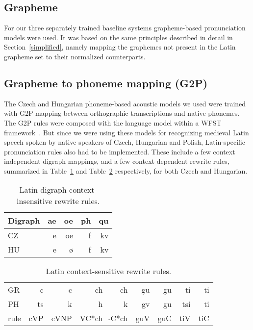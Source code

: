 \documentclass[runningheads,a4paper]{llncs}
\begin{document}
\subsection{Grapheme}
For our three separately trained baseline systems grapheme-based pronunciation models were used.
It was based on the same principles described in detail in Section~\ref{simplified}, namely mapping the graphemes not present in the Latin grapheme set to their normalized counterparts.
\subsection{Grapheme to phoneme mapping (G2P)}\label{g2p}
The Czech and Hungarian phoneme-based acoustic models we used were trained with G2P mapping between orthographic transcriptions and native phonemes.
The G2P rules were composed with the language model within a WFST framework~\cite{wfst}.
But since we were using these models for recognizing medieval Latin speech spoken by native speakers of Czech, Hungarian and Polish, Latin-specific pronunciation rules also had to be implemented. 
These include a few context independent digraph mappings, and a few context dependent rewrite rules, summarized in Table~\ref{tbl:digraph} and Table~\ref{tbl:context} respectively, for both Czech and Hungarian.

\begin{table}\label{tbl:digraph}
	\centering
	\caption{Latin digraph context-insensitive rewrite rules.}
	\begin{tabular}{l|rrrr}
	\hline
	Digraph & ae & oe & ph & qu \\
	\hline
	CZ & e & oe & f & kv \\
	HU & e & \o & f & kv \\
	\hline
	\end{tabular}
\end{table}

\begin{table}\label{tbl:context}
	\centering
	\caption{Latin context-sensitive rewrite rules.}
	\begin{tabular}{l|rr|rr|rr|rr}
	\hline
	GR & c & c & ch & ch & gu & gu & ti & ti \\
	PH & ts & k & h & k & gv & gu & tsi & ti \\
	\hline
	rule & cVP & cVNP & VC*ch & $\hat{}$C*ch & guV & guC & tiV & tiC \\
	\hline
	\end{tabular}
\end{table}
\end{document}
